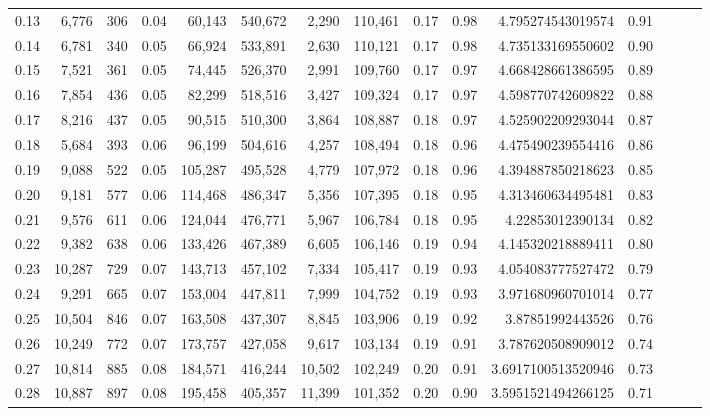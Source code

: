 \begin{tabular}{rrrrrrrrrrrrrrr}
0.13 &   6,776 &    306 &  0.04 &   60,143 &  540,672 &    2,290 &  110,461 &  0.17 &  0.98 &     4.795274543019574 &      0.91 \\
0.14 &   6,781 &    340 &  0.05 &   66,924 &  533,891 &    2,630 &  110,121 &  0.17 &  0.98 &     4.735133169550602 &      0.90 \\
0.15 &   7,521 &    361 &  0.05 &   74,445 &  526,370 &    2,991 &  109,760 &  0.17 &  0.97 &     4.668428661386595 &      0.89 \\
0.16 &   7,854 &    436 &  0.05 &   82,299 &  518,516 &    3,427 &  109,324 &  0.17 &  0.97 &     4.598770742609822 &      0.88 \\
0.17 &   8,216 &    437 &  0.05 &   90,515 &  510,300 &    3,864 &  108,887 &  0.18 &  0.97 &     4.525902209293044 &      0.87 \\
0.18 &   5,684 &    393 &  0.06 &   96,199 &  504,616 &    4,257 &  108,494 &  0.18 &  0.96 &     4.475490239554416 &      0.86 \\
0.19 &   9,088 &    522 &  0.05 &  105,287 &  495,528 &    4,779 &  107,972 &  0.18 &  0.96 &     4.394887850218623 &      0.85 \\
0.20 &   9,181 &    577 &  0.06 &  114,468 &  486,347 &    5,356 &  107,395 &  0.18 &  0.95 &     4.313460634495481 &      0.83 \\
0.21 &   9,576 &    611 &  0.06 &  124,044 &  476,771 &    5,967 &  106,784 &  0.18 &  0.95 &      4.22853012390134 &      0.82 \\
0.22 &   9,382 &    638 &  0.06 &  133,426 &  467,389 &    6,605 &  106,146 &  0.19 &  0.94 &     4.145320218889411 &      0.80 \\
0.23 &  10,287 &    729 &  0.07 &  143,713 &  457,102 &    7,334 &  105,417 &  0.19 &  0.93 &     4.054083777527472 &      0.79 \\
0.24 &   9,291 &    665 &  0.07 &  153,004 &  447,811 &    7,999 &  104,752 &  0.19 &  0.93 &     3.971680960701014 &      0.77 \\
0.25 &  10,504 &    846 &  0.07 &  163,508 &  437,307 &    8,845 &  103,906 &  0.19 &  0.92 &      3.87851992443526 &      0.76 \\
0.26 &  10,249 &    772 &  0.07 &  173,757 &  427,058 &    9,617 &  103,134 &  0.19 &  0.91 &     3.787620508909012 &      0.74 \\
0.27 &  10,814 &    885 &  0.08 &  184,571 &  416,244 &   10,502 &  102,249 &  0.20 &  0.91 &    3.6917100513520946 &      0.73 \\
0.28 &  10,887 &    897 &  0.08 &  195,458 &  405,357 &   11,399 &  101,352 &  0.20 &  0.90 &    3.5951521494266125 &      0.71 \\

\end{tabular}
